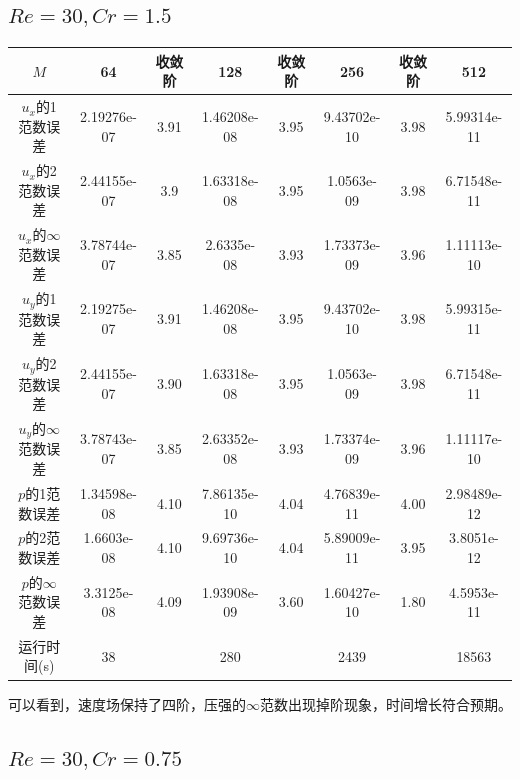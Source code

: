 \documentclass[lang=cn,10pt,bibend=bibtex]{elegantbook}
\begin{document}
\subsection{$Re=30,Cr=1.5$}
\vspace{-1em}
\begin{table}[H]
  \centering
  \small
  \begin{tabular}{c|ccccccc}
  \textbf{$M$}              & 64          & 收敛阶 & 128         & 收敛阶 & 256         & 收敛阶 & 512   \\ \hline
  $u_x$的1范数误差 & 2.19276e-07 & 3.91 & 1.46208e-08 & 3.95 & 9.43702e-10 & 3.98 & 5.99314e-11\\
  $u_x$的2范数误差 & 2.44155e-07 & 3.9 & 1.63318e-08 & 3.95 & 1.0563e-09 & 3.98 & 6.71548e-11\\
  $u_x$的$\infty$范数误差 & 3.78744e-07 & 3.85 & 2.6335e-08 & 3.93 & 1.73373e-09 & 3.96 & 1.11113e-10\\
  $u_y$的1范数误差 & 2.19275e-07 & 3.91 & 1.46208e-08 & 3.95 & 9.43702e-10 & 3.98 & 5.99315e-11\\
  $u_y$的2范数误差 & 2.44155e-07 & 3.90 & 1.63318e-08 & 3.95 & 1.0563e-09 & 3.98 & 6.71548e-11\\
  $u_y$的$\infty$范数误差 & 3.78743e-07 & 3.85 & 2.63352e-08 & 3.93 & 1.73374e-09 & 3.96 & 1.11117e-10\\
  $p$的1范数误差 & 1.34598e-08 & 4.10 & 7.86135e-10 & 4.04 & 4.76839e-11 & 4.00 & 2.98489e-12\\
  $p$的2范数误差 & 1.6603e-08 & 4.10 & 9.69736e-10 & 4.04 & 5.89009e-11 & 3.95 & 3.8051e-12\\
  $p$的$\infty$范数误差 & 3.3125e-08 & 4.09 & 1.93908e-09 & 3.60 & 1.60427e-10 & 1.80 & 4.5953e-11\\  
  运行时间(s)                &      38      &       &     280      &       &     2439     &       &  18563
  \end{tabular}
\end{table}

可以看到，速度场保持了四阶，压强的$\infty$范数出现掉阶现象，时间增长符合预期。

\subsection{$Re=30,Cr=0.75$}
\end{document}
